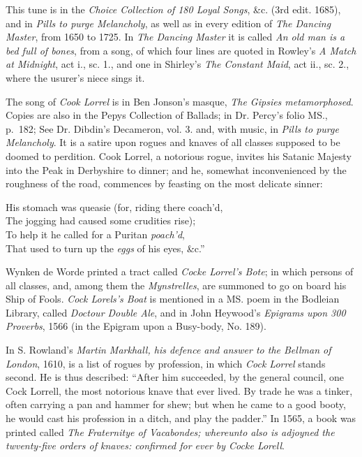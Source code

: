 This tune is in the \textit{Choice Collection of 180 Loyal Songs}, \&c. (3rd edit. 1685),
and in \textit{Pills to purge Melancholy}, as well as in every edition of \textit{The Dancing
Master}, from 1650 to 1725. In \textit{The Dancing Master} it is called \textit{An old man is
a bed full of bones}, from a song, of which four lines are quoted in Rowley’s
\textit{A Match at Midnight}, act i., sc. 1., and one in Shirley’s \textit{The Constant Maid},
act ii., sc. 2., where the usurer’s niece sings it.

The song of \textit{Cook Lorrel} is in Ben Jonson’s masque, \textit{The Gipsies metamorphosed}. 
Copies are also in the Pepys Collection of Ballads; in Dr. Percy’s folio
MS., p.~182;\scfootnote
{See Dr. Dibdin’s Decameron, vol. 3.} and, with music, in \textit{Pills to purge Melancholy}. It is a satire upon
rogues and knaves of all classes supposed to be doomed to perdition. Cook
Lorrel, a notorious rogue, invites his Satanic Majesty into the Peak in Derbyshire
to dinner; and he, somewhat inconvenienced by the roughness of the
road, commences by feasting on the most delicate sinner:

\settowidth{\versewidth}{His stomach was queasie (for, riding there coach’d,}
\begin{scverse}
\begin{altverse}
His stomach was queasie (for, riding there coach’d,\\
The jogging had caused some crudities rise);\\
To help it he called for a Puritan \textit{poach’d},\\
That used to turn up the \textit{eggs} of his eyes, \&c.”
\end{altverse}
\end{scverse}
\pagebreak

Wynken de Worde printed a tract called \textit{Cocke Lorrel’s Bote}; in which persons
of all classes, and, among them the \textit{Mynstrelles}, are summoned to go on board
his Ship of Fools. \textit{Cock Lorels’s Boat} is mentioned in a MS. poem in the
Bodleian Library, called \textit{Doctour Double Ale}, and in John Heywood’s \textit{Epigrams
upon 300 Proverbs}, 1566 (in the Epigram upon a Busy-body, No. 189).

In S. Rowland’s \textit{Martin Markhall, his defence and answer to the Bellman of
London}, 1610, is a list of rogues by profession, in which \textit{Cock Lorrel} stands
second. He is thus described: “After him succeeded, by the general council,
one Cock Lorrell, the most notorious knave that ever lived. By trade he was a
tinker, often carrying a pan and hammer for shew; but when he came to a good
booty, he would cast his profession in a ditch, and play the padder.” In 1565,
a book was printed called \textit{The Fraternitye of Vacabondes; whereunto also is
adjoyned the twventy-five orders of knaves: confirmed for ever by Cocke Lorell}.

